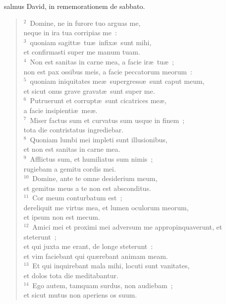 \bchapter
{}salmus David, in rememorationem de sabbato.
\begin{flushleft}\begin{verse}\vspace{6pt}${}^{2}$~Domine, ne in furore tuo arguas me,\\ neque in ira tua corripias me~:\\
${}^{3}$~quoniam sagitt\ae\ tu\ae\ infix\ae\ sunt mihi,\\ et confirmasti super me manum tuam.\\
${}^{4}$~Non est sanitas in carne mea, a facie ir\ae\ tu\ae~;\\ non est pax ossibus meis, a facie peccatorum meorum~:\\
${}^{5}$~quoniam iniquitates me\ae\ supergress\ae\ sunt caput meum,\\ et sicut onus grave gravat\ae\ sunt super me.\\
${}^{6}$~Putruerunt et corrupt\ae\ sunt cicatrices me\ae ,\\ a facie insipienti\ae\ me\ae .\\
${}^{7}$~Miser factus sum et curvatus sum usque in finem~;\\ tota die contristatus ingrediebar.\\
${}^{8}$~Quoniam lumbi mei impleti sunt illusionibus,\\ et non est sanitas in carne mea.\\
${}^{9}$~Afflictus sum, et humiliatus sum nimis~;\\ rugiebam a gemitu cordis mei.\\
${}^{10}$~Domine, ante te omne desiderium meum,\\ et gemitus meus a te non est absconditus.\\
${}^{11}$~Cor meum conturbatum est~;\\ dereliquit me virtus mea, et lumen oculorum meorum,\\ et ipsum non est mecum.\\
${}^{12}$~Amici mei et proximi mei adversum me appropinquaverunt, et steterunt~;\\ et qui juxta me erant, de longe steterunt~:\\ et vim faciebant qui qu\ae rebant animam meam.\\
${}^{13}$~Et qui inquirebant mala mihi, locuti sunt vanitates,\\ et dolos tota die meditabantur.\\
${}^{14}$~Ego autem, tamquam surdus, non audiebam~;\\ et sicut mutus non aperiens os suum.\\

\end{verse}
\end{flushleft}
